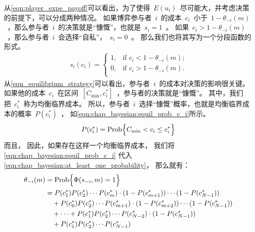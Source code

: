 从\eqref{eqn:player_expe_payoff}可以看出，为了使得~$E(u_i)$~尽可能大，并考虑决策的前提下，可以分成两种情况。
如果博弈参与者~$i$~的成本~$c_i$~小于~$1-\theta_{-i}(m)$~，那么参与者~$i$~的决策就是“慷慨”，也就是~$s_{i}=1$~。
如果~$c_i > 1 - \theta_{-i} (m)$~，那么参与者~$i$~会选择“自私”，~$s_i = 0$~。
那么我们也将其写为一个分段函数的形式。
\begin{align}
    s_i(c_i) = \begin{cases} 
        1, &\text{if $c_i < 1 -\theta_{-i}(m)$;}\\
        0, &\text{if $c_i > 1 -\theta_{-i}(m)$.}\\ \end{cases} 
    \label{eqn_equilibrium_strategy} 
\end{align}
从\eqref{eqn_equilibrium_strategy}可以看出，参与者~$i$~的成本对决策的影响很关键。
如果他的成本~$c_i$~在区间~$ [C_{\min}, c_i^*] $~，参与者的决策就是“慷慨”。
其中，我们把~$c_i^*$~称为均衡临界成本。
所以，参与者~$i$~选择“慷慨”概率，也就是均衡临界成本的概率~$P(c_i^*)$~，
如\eqref{eqn:chap_bayesian:equil_prob_c_i}所示。
\begin{align}
    P(c_i^*) = \hbox{Prob} \Bigl\{ C_{\min} < c_i \leq c_i^* \Bigr\} 
    \label{eqn:chap_bayesian:equil_prob_c_i}
\end{align}
而且，
因此，如果存在这样一个均衡临界成本，
我们将\eqref{eqn:chap_bayesian:equil_prob_c_i} 代入\eqref{eqn:chap_bayesian:at_least_one_probability}，
那么就有：
\begin{align} 
    \theta_{-i}(m) &= \hbox{Prob} \Bigl\{ \Phi( s_{-i},m) = 1 \Bigr\} \notag \\ 
   &= P(c_1^*)P(c_2^*)\cdots P(c_{m}^*) \cdot (1-P(c_{m+1}^*)) \cdots(1-P(c_{N-1}^*)) \notag \\ 
    & \quad +  P(c_0^*)P(c_2^*)\cdots P(c_{m+1}^*) \cdot (1-P(c_{m+2}^*)) \cdots(1-P(c_{N-1}^*)) \notag \\ 
    & \quad + \cdots  + P(c_1^*)P(c_2^*)\cdots P(c_{N-2}^*) \cdot (1-P(c_{N-1}^*)) \notag \\
    & \quad +  P(c_1^*)P(c_2^*)\cdots P(c_{N-1}^*)  
    \label{eqn:chap_bayesian:two_poly_distribution}
\end{align}
